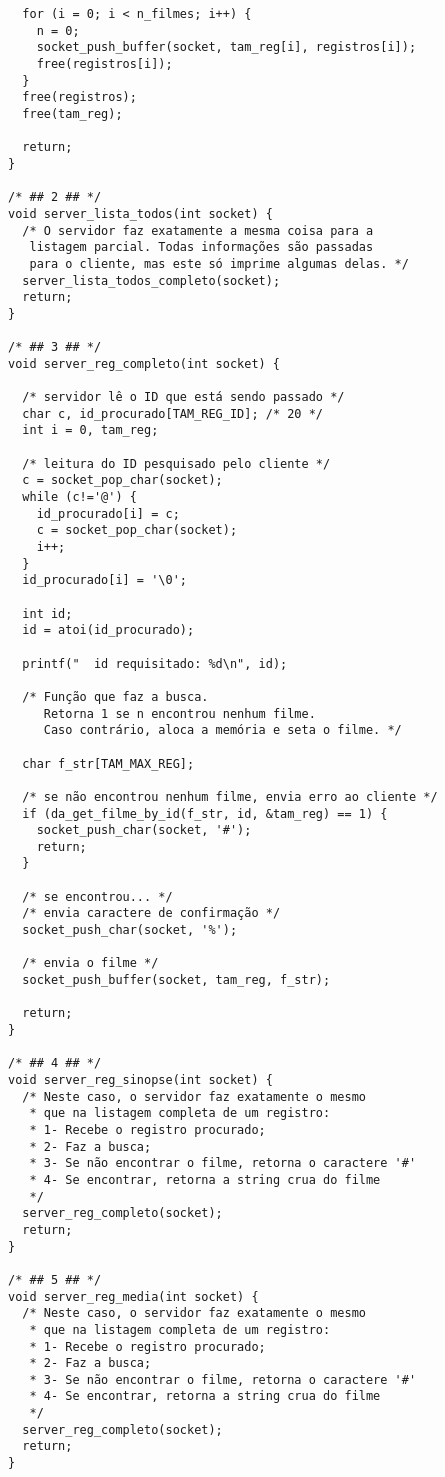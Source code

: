 \documentclass[11pt,twoside]{article}
\begin{document}
\begin{verbatim}
  for (i = 0; i < n_filmes; i++) {
    n = 0;
    socket_push_buffer(socket, tam_reg[i], registros[i]);
    free(registros[i]);
  }
  free(registros);
  free(tam_reg);

  return;
}

/* ## 2 ## */
void server_lista_todos(int socket) {
  /* O servidor faz exatamente a mesma coisa para a 
   listagem parcial. Todas informações são passadas
   para o cliente, mas este só imprime algumas delas. */
  server_lista_todos_completo(socket);
  return;
}

/* ## 3 ## */
void server_reg_completo(int socket) {
  
  /* servidor lê o ID que está sendo passado */
  char c, id_procurado[TAM_REG_ID]; /* 20 */
  int i = 0, tam_reg;

  /* leitura do ID pesquisado pelo cliente */
  c = socket_pop_char(socket);
  while (c!='@') {
    id_procurado[i] = c;
    c = socket_pop_char(socket);
    i++;
  }
  id_procurado[i] = '\0';

  int id;
  id = atoi(id_procurado);

  printf("  id requisitado: %d\n", id);

  /* Função que faz a busca.
     Retorna 1 se n encontrou nenhum filme.
     Caso contrário, aloca a memória e seta o filme. */
  
  char f_str[TAM_MAX_REG];

  /* se não encontrou nenhum filme, envia erro ao cliente */
  if (da_get_filme_by_id(f_str, id, &tam_reg) == 1) {
    socket_push_char(socket, '#');
    return;
  }

  /* se encontrou... */
  /* envia caractere de confirmação */
  socket_push_char(socket, '%');
  
  /* envia o filme */
  socket_push_buffer(socket, tam_reg, f_str);

  return;
}

/* ## 4 ## */
void server_reg_sinopse(int socket) {
  /* Neste caso, o servidor faz exatamente o mesmo  
   * que na listagem completa de um registro:
   * 1- Recebe o registro procurado;
   * 2- Faz a busca;
   * 3- Se não encontrar o filme, retorna o caractere '#'
   * 4- Se encontrar, retorna a string crua do filme
   */
  server_reg_completo(socket);
  return;
}

/* ## 5 ## */
void server_reg_media(int socket) {
  /* Neste caso, o servidor faz exatamente o mesmo  
   * que na listagem completa de um registro:
   * 1- Recebe o registro procurado;
   * 2- Faz a busca;
   * 3- Se não encontrar o filme, retorna o caractere '#'
   * 4- Se encontrar, retorna a string crua do filme
   */
  server_reg_completo(socket);
  return;
}


\end{verbatim}
\end{document}
